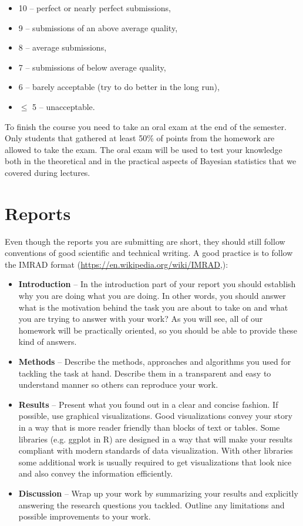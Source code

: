 \documentclass[fleqn,moreauthors,10pt]{ds_report}
\begin{document}
\begin{itemize}
	\item 10 -- perfect or nearly perfect submissions,
	\item 9 -- submissions of an above average quality,
	\item 8 -- average submissions,
	\item 7 -- submissions of below average quality,
	\item 6 -- barely acceptable (try to do better in the long run),
	\item $\leq$ 5 -- unacceptable.
\end{itemize}

To finish the course you need to take an oral exam at the end of the semester. Only students that gathered at least 50\% of points from the homework are allowed to take the exam. The oral exam will be used to test your knowledge both in the theoretical and in the practical aspects of Bayesian statistics that we covered during lectures.

\section*{Reports}

Even though the reports you are submitting are short, they should still follow conventions of good scientific and technical writing. A good practice is to follow the IMRAD format (\url{https://en.wikipedia.org/wiki/IMRAD},):

\begin{itemize}
	\item \textbf{Introduction} -- In the introduction part of your report you should establish why you are doing what you are doing. In other words, you should answer what is the motivation behind the task you are about to take on and what you are trying to answer with your work? As you will see, all of our homework will be practically oriented, so you should be able to provide these kind of answers.
	\item \textbf{Methods} -- Describe the methods, approaches and algorithms you used for tackling the task at hand. Describe them in a transparent and easy to understand manner so others can reproduce your work.
	\item \textbf{Results} -- Present what you found out in a clear and concise fashion. If possible, use graphical visualizations. Good visualizations convey your story in a way that is more reader friendly than blocks of text or tables. Some libraries (e.g. ggplot in R) are designed in a way that will make your results compliant with modern standards of data visualization. With other libraries some additional work is usually required to get visualizations that look nice and also convey the information efficiently.
	\item \textbf{Discussion} -- Wrap up your work by summarizing your results and explicitly answering the research questions you tackled. Outline any limitations and possible improvements to your work.
\end{itemize}
\end{document}
